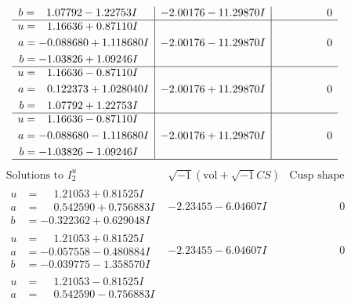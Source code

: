 \documentclass[1p]{elsarticle_modified}
\theoremstyle{definition}
\newcommand{\I}{\sqrt{-1}}
\begin{document}
$$\begin{array}{c|c|c}
\begin{aligned}
b &= \phantom{-}1.07792 - 1.22753 I\end{aligned}
 & -2.00176 - 11.29870 I & \phantom{-0.000000 } 0 \\ \hline\begin{aligned}
u &= \phantom{-}1.16636 + 0.87110 I \\
a &= -0.088680 + 1.118680 I \\
b &= -1.03826 + 1.09246 I\end{aligned}
 & -2.00176 - 11.29870 I & \phantom{-0.000000 } 0 \\ \hline\begin{aligned}
u &= \phantom{-}1.16636 - 0.87110 I \\
a &= \phantom{-}0.122373 + 1.028040 I \\
b &= \phantom{-}1.07792 + 1.22753 I\end{aligned}
 & -2.00176 + 11.29870 I & \phantom{-0.000000 } 0 \\ \hline\begin{aligned}
u &= \phantom{-}1.16636 - 0.87110 I \\
a &= -0.088680 - 1.118680 I \\
b &= -1.03826 - 1.09246 I\end{aligned}
 & -2.00176 + 11.29870 I & \phantom{-0.000000 } 0\\
 \hline 
 \end{array}$$\newpage$$\begin{array}{c|c|c}  
\text{Solutions to }I^u_{2}& \I (\text{vol} + \sqrt{-1}CS) & \text{Cusp shape}\\
 \hline 
\begin{aligned}
u &= \phantom{-}1.21053 + 0.81525 I \\
a &= \phantom{-}0.542590 + 0.756883 I \\
b &= -0.322362 + 0.629048 I\end{aligned}
 & -2.23455 - 6.04607 I & \phantom{-0.000000 } 0 \\ \hline\begin{aligned}
u &= \phantom{-}1.21053 + 0.81525 I \\
a &= -0.057558 - 0.480884 I \\
b &= -0.039775 - 1.358570 I\end{aligned}
 & -2.23455 - 6.04607 I & \phantom{-0.000000 } 0 \\ \hline\begin{aligned}
u &= \phantom{-}1.21053 - 0.81525 I \\
a &= \phantom{-}0.542590 - 0.756883 I \\

\end{aligned}
\end{array}$$
\end{document}
